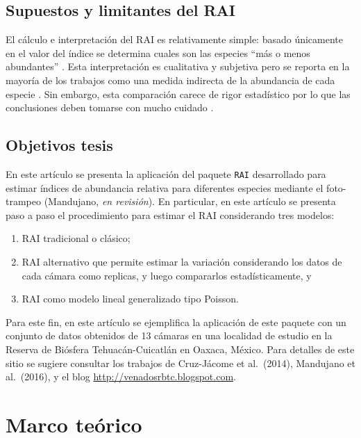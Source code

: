 \documentclass[
  10.5pt,
  a5paper]{book}
\providecommand{\tightlist}{%
  \setlength{\itemsep}{0pt}\setlength{\parskip}{0pt}}
\begin{document}
\section{Supuestos y limitantes del RAI}\label{supuestos-y-limitantes-del-rai}

El cálculo e interpretación del RAI es relativamente simple: basado únicamente en el valor del índice se determina cuales son las especies ``más o menos abundantes'' \citep{mccaffery1976deer}. Esta interpretación es cualitativa y subjetiva pero se reporta en la mayoría de los trabajos como una medida indirecta de la abundancia de cada especie \citep{sutherland2006ecological}. Sin embargo, esta comparación carece de rigor estadístico por lo que las conclusiones deben tomarse con mucho cuidado \citep{sutherland2006ecological}.

\section{Objetivos tesis}\label{objetivos-tesis}

En este artículo se presenta la aplicación del paquete \texttt{RAI} desarrollado para estimar índices de abundancia relativa para diferentes especies mediante el foto-trampeo (Mandujano, \emph{en revisión}). En particular, en este artículo se presenta paso a paso el procedimiento para estimar el RAI considerando tres modelos:

\begin{enumerate}
\def\labelenumi{\arabic{enumi})}
\tightlist
\item
  RAI tradicional o clásico;
\item
  RAI alternativo que permite estimar la variación considerando los datos de cada cámara como replicas, y luego compararlos estadísticamente, y
\item
  RAI como modelo lineal generalizado tipo Poisson.
\end{enumerate}

Para este fin, en este artículo se ejemplifica la aplicación de este paquete con un conjunto de datos obtenidos de 13 cámaras en una localidad de estudio en la Reserva de Biósfera Tehuacán-Cuicatlán en Oaxaca, México. Para detalles de este sitio se sugiere consultar los trabajos de Cruz-Jácome et al.~(2014), Mandujano et al.~(2016), y el blog \url{http://venadosrbtc.blogspot.com}.

\chapter{Marco teórico}\label{marco-teuxf3rico}
\end{document}
